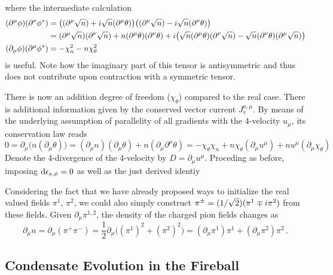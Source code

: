 where the intermediate calculation
\begin{subequations}
    \begin{align}
        (\partial^\mu\phi)(\partial^\nu\phi^*)&=\big((\partial^\mu\sqrt{n})+{i}\sqrt{n}(\partial^\mu\theta)\big)\big((\partial^\nu\sqrt{n})-{i}\sqrt{n}(\partial^\nu\theta)\big)\\
        &=(\partial^\mu\sqrt{n})(\partial^\nu\sqrt{n})+n(\partial^\mu\theta)(\partial^\nu\theta)+{i}\big(\sqrt{n}(\partial^\mu\theta)(\partial^\nu\sqrt{n})-\sqrt{n}(\partial^\nu\theta)(\partial^\mu\sqrt{n})\big)\\
        (\partial_\mu\phi)(\partial^\mu\phi^*)&=-\chi_n^2-n\chi_\theta^2
    \end{align}
\end{subequations}
is useful. Note how the imaginary part of this tensor is antisymmetric and thus does not contribute upon contraction with a symmetric tensor.

There is now an addition degree of freedom ($\chi_\theta$) compared to the real case. There is additional information given by the conserved vector current $J_v^{a,\mu}$. By means of the underlying assumption of parallelity of all gradients with the 4-velocity $u_\mu$, its conservation law reads
\begin{equation}
        0=\partial_\mu\big(n(\partial_\mu\theta)\big)=(\partial_\mu n)(\partial_\mu\theta)+n(\partial_\mu\partial^\mu\theta)=-\chi_\theta\chi_n+n\chi_\theta(\partial_\mu u^\mu)+nu^\mu(\partial_\mu\chi_\theta)
\end{equation}
Denote the 4-divergence of the 4-velocity by ${D=\partial_\mu u^\mu}$. Proceding as before, imposing ${\text{d}\epsilon_{s,\phi}=0}$ as well as the just derived identiy

Considering the fact that we have already proposed ways to initialize the real valued fields $\pi^1$, $\pi^2$, we could also simply construct $\pi^\pm=(1/\sqrt{2})(\pi^1\mp{i}\pi^2)$ from these fields. Given $\partial_\mu\pi^{1,2}$, the density of the charged pion fields changes as
\begin{equation}
    \partial_\mu n=\partial_\mu(\pi^+\pi^-)=\frac{1}{2}\partial_\mu\big((\pi^1)^2+(\pi^2)^2\big)=(\partial_\mu\pi^1)\pi^1+(\partial_\mu\pi^2)\pi^2\,.
\end{equation}

\subsection{Condensate Evolution in the Fireball}

